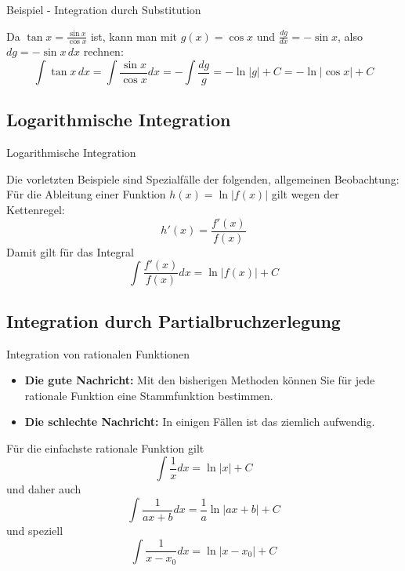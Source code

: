 \begin{frame}{Beispiel - Integration durch Substitution}
\begin{example}
	Da $\tan x = \frac{\sin x}{\cos x}$ ist, kann man mit $g(x)=\cos x$ und $\frac{dg}{dx}= -\sin x$, also $dg = -\sin x \,dx$ rechnen:
	\[
		\int \tan x \, dx = \int \frac{\sin x}{\cos x} dx = - \int \frac{dg}{g} = -\ln |g| +C = -\ln |\cos x| + C
	\]
\end{example}
\end{frame}

\subsection{Logarithmische Integration}
\begin{frame}{Logarithmische Integration}
\begin{bemerkung}
	Die vorletzten Beispiele sind Spezialfälle der folgenden, allgemeinen Beobachtung:
	Für die Ableitung einer Funktion $h(x)=\ln |f(x)|$ gilt wegen der Kettenregel:
	\[
		h'(x)=\frac{f'(x)}{f(x)}
	\]
	Damit gilt für das Integral
	\[
		\int \frac{f'(x)}{f(x)}dx = \ln |f(x)| + C
	\]
\end{bemerkung}
\end{frame}

\subsection{Integration durch Partialbruchzerlegung}
\begin{frame}{Integration von rationalen Funktionen}
	\begin{bemerkung}
	\begin{itemize}
		\item \textbf{Die gute Nachricht:} Mit den bisherigen Methoden können Sie für jede rationale Funktion eine Stammfunktion bestimmen.
		\item \textbf{Die schlechte Nachricht:} In einigen Fällen ist das ziemlich aufwendig.
	\end{itemize}
	\end{bemerkung}
\small{	\begin{example}
		Für die einfachste rationale Funktion gilt
		\[	
			\int \frac{1}{x} dx = \ln |x| +C
		\]
		und daher auch
		\[
			\int \frac{1}{ax+b} dx = \frac{1}{a} \ln |ax+b| + C
		\]
		und speziell
		\[
			\int \frac{1}{x-x_{0}} dx = \ln |x-x_{0}| + C
		\]
	\end{example}}
\end{frame}

